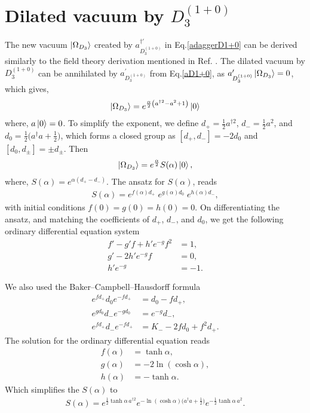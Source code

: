 \documentclass[%
 reprint,
superscriptaddress,
 amsmath,amssymb,
 aps,
]{revtex4-2}
\begin{document}
\section{Dilated vacuum by \texorpdfstring{$D_{3}^{(1+0)}$}{TEXT}} 
\label{Dilated-vacuum}
The new vacuum $\ket{\Omega_{D_{3}}}$ created by $a^{\dagger\prime}_{D^{(1+0)}_{3}}$ in Eq.\eqref{adaggerD1+0} can be derived similarly to the field theory derivation mentioned in Ref. \cite{umezawa1982thermo}. The dilated vacuum by $D_{3}^{(1+0)}$ can be annihilated by $a^{\prime}_{D^{(1+0)}_{3}}$ from Eq.\eqref{aD1+0}, as $ a^{\prime}_{D^{(1+0)}_{3}}\ket{\Omega_{D_{3}}}=0$, which gives, 
\begin{align}
    \ket{\Omega_{D_{3}}}=e^{\frac{\alpha}{2}\left(a^{\dagger 2} - a^2+1\right)}\ket{0}
\end{align}
where, $a\ket{0}=0$. To simplify the exponent, we define $d_{+}=\frac12 a^{\dagger2}$, $d_{-}=\frac12 a^{2}$, and $d_{0}=\frac12\bigl(a^{\dagger}a+\tfrac12\bigr)$, which forms a closed group as $[d_{+},d_{-}]=-2d_{0}$ and $[d_{0},d_{\pm}]=\pm d_{\pm}$. Then
\begin{align}
    \ket{\Omega_{D_{3}}}=e^{\frac{\alpha}{2}}S(\alpha)\ket{0},
\end{align}
where, $S(\alpha)=e^{\alpha(d_{+}-d_{-})}$. The ansatz for $S(\alpha)$, reads
\begin{align}
S(\alpha)=e^{f(\alpha)d_{+}}\;e^{g(\alpha)d_{0}}\;e^{h(\alpha)d_{-}},
\end{align}
with initial conditions $f(0)=g(0)=h(0)=0$. On differentiating the ansatz, and matching the coefficients of $d_{+}$, $d_{-}$, and $d_{0}$, we get the following ordinary differential equation system
\begin{align}
f'-g'f+h'e^{-g}f^{2}&=1,\\
g'-2h'e^{-g}f&=0,\\
h'e^{-g}&=-1.
\end{align}

We also used the Baker–Campbell–Hausdorff formula
\begin{align}
    e^{f d_{+}}d_{0}e^{-f d_{+}}&=d_{0}-f d_{+},\\
e^{g d_{0}}d_{-}e^{-g d_{0}}&=e^{-g}d_{-},\\
e^{f d_{+}}d_{-}e^{-f d_{+}}&=K_{-}-2fd_{0}+f^{2}d_{+}.
\end{align}
The solution for the ordinary differential equation reads 
\begin{align}
    f(\alpha)&=\tanh\alpha,\\
g(\alpha)&=-2\ln(\cosh\alpha),\\
h(\alpha)&=-\tanh\alpha.
\end{align}
Which simplifies the $S(\alpha)$ to 
\begin{align}
    S(\alpha)
   =e^{\tfrac12\tanh\alpha\,a^{\dagger2}} e^{-\ln(\cosh\alpha)\bigl(a^{\dagger}a+\tfrac12\bigr)} e^{-\tfrac12\tanh\alpha\,a^{2}}.
\end{align}
\end{document}

